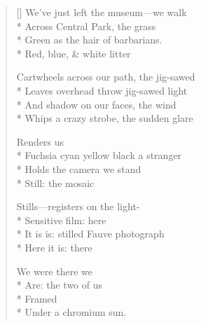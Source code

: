 \label{ch:polaroid}
\settowidth{\versewidth}{Fuchsia   cyan   yellow   black   a stranger}
\begin{verse}[\versewidth]
We've just left the museum---we walk\\*
Across Central Park, the grass\\*
Green as the hair of barbarians.\\*
Red, blue, \& white litter

Cartwheels across our path, the jig-sawed\\*
Leaves overhead throw jig-sawed light\\*
And shadow on our faces, the wind\\*
Whips a crazy strobe, the sudden glare

Renders us\\*
Fuchsia   cyan   yellow   black   a stranger\\*
Holds the camera     we stand\\*
Still: the mosaic

Stills---registers on the light-\\*
Sensitive film: here\\*
It is is: stilled Fauve photograph\\*
Here it is: there

We were there we\\*
Are: the two of us\\*
Framed\\*
Under a chromium sun.
\end{verse}
